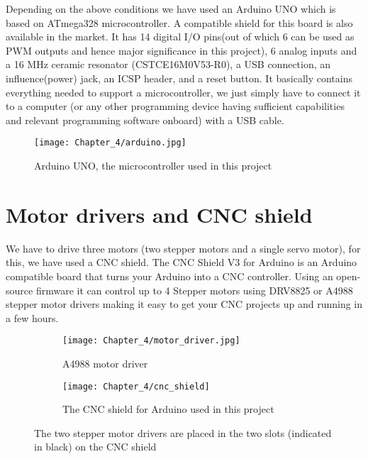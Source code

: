 Depending on the above conditions we have used an Arduino UNO which is based on ATmega328 microcontroller. A compatible shield for this board is also available in the market. It has 14 digital I/O pins(out of which 6 can be used as PWM outputs and hence major significance in this project), 6 analog inputs and a 16 MHz ceramic resonator (CSTCE16M0V53-R0), a USB connection, an influence(power) jack, an ICSP header, and a reset button. It basically contains everything needed to support a microcontroller, we just simply have to connect it to a computer (or any other programming device having sufficient capabilities and relevant programming software onboard) with a USB cable.

\begin{figure}[h]
 \centering
 \texttt{[image: Chapter\_4/arduino.jpg]}
 \caption{Arduino UNO, the microcontroller used in this project}
 \label{fig:arduino}
\end{figure}

\section{Motor drivers and CNC shield} \label{cncs}

We have to drive three motors (two stepper motors and a single servo motor), for this, we have used a CNC shield. The CNC Shield V3 for Arduino is an Arduino compatible board that turns your Arduino into a CNC controller. Using an open-source firmware it can control up to 4 Stepper motors using DRV8825 or A4988 stepper motor drivers making it easy to get your CNC projects up and running in a few hours.

\begin{figure}[h]

 \begin{subfigure}{0.5\textwidth}
  \texttt{[image: Chapter\_4/motor\_driver.jpg]}
  \caption{A4988 motor driver}
  \label{fig:motor_driver}
 \end{subfigure}
 \begin{subfigure}{0.5\textwidth}
  \hspace{8mm}
  \texttt{[image: Chapter\_4/cnc\_shield]}
  \caption{The CNC shield for Arduino used in this project}
  \label{fig:shield}
 \end{subfigure}

 \caption{The two stepper motor drivers are placed in the two slots (indicated in black) on the CNC shield}
 \label{fig:driver_and_shield}
\end{figure}


